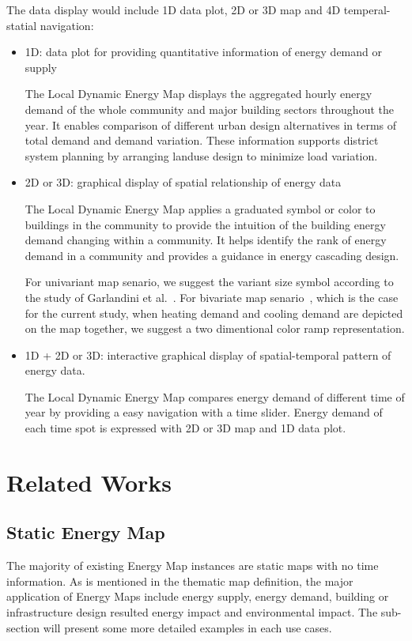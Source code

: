 \documentclass[hidelinks,12pt]{article}
\begin{document}
The data display would include 1D data plot, 2D or 3D map and 4D
temperal-statial navigation:
\begin{itemize}
\item 1D: data plot for providing quantitative information of energy
  demand or supply

  The Local Dynamic Energy Map displays the aggregated hourly energy
  demand of the whole community and major building sectors throughout
  the year. It enables comparison of different urban design
  alternatives in terms of total demand and demand variation. These
  information supports district system planning by arranging landuse
  design to minimize load variation.

\item 2D or 3D: graphical display of spatial relationship of energy data

  The Local Dynamic Energy Map applies a graduated symbol or color to
  buildings in the community to provide the intuition of the building
  energy demand changing within a community. It helps identify the
  rank of energy demand in a community and provides a guidance in
  energy cascading design.
    
  For univariant map senario, we suggest the variant size symbol
  according to the study of Garlandini et
  al.~\cite{Garlandini2009}. For bivariate map
  senario~\cite{bimapWiki}, which is the case for the current study,
  when heating demand and cooling demand are depicted on the map
  together, we suggest a two dimentional color ramp representation.

\item 1D + 2D or 3D: interactive graphical display of spatial-temporal
  pattern of energy data.
  
  The Local Dynamic Energy Map compares energy demand of different
  time of year by providing a easy navigation with a time
  slider. Energy demand of each time spot is expressed with 2D or 3D
  map and 1D data plot.
\end{itemize}

\section{Related Works}
\subsection{Static Energy Map}
The majority of existing Energy Map instances are static maps with no
time information. As is mentioned in the thematic map definition, the
major application of Energy Maps include energy supply, energy demand,
building or infrastructure design resulted energy impact and
environmental impact. The sub-section will present some more detailed
examples in each use cases.
\end{document}
